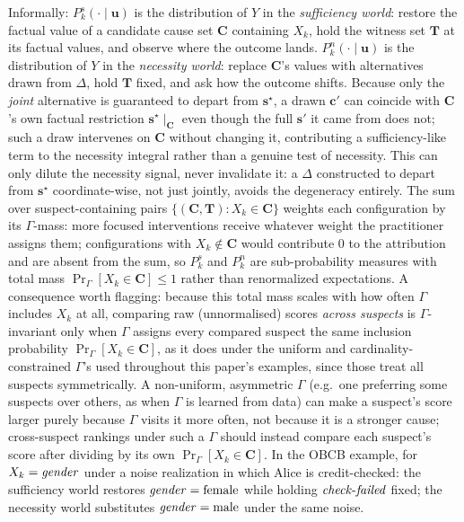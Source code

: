 \medskip\noindent
Informally: $P_k^s(\cdot\mid\mathbf{u})$ is the distribution of $Y$ in the
\emph{sufficiency world}: restore the factual value of a candidate cause set
$\mathbf{C}$ containing $X_k$, hold the witness set $\mathbf{T}$ at its factual values,
and observe where the outcome lands. $P_k^n(\cdot\mid\mathbf{u})$ is the distribution of
$Y$ in the \emph{necessity world}: replace $\mathbf{C}$'s values with alternatives
drawn from $\Delta$, hold $\mathbf{T}$ fixed, and ask how the outcome shifts.
Because only the \emph{joint} alternative is guaranteed to depart from
$\mathbf{s}^\star$, a drawn $\mathbf{c}'$ can coincide with $\mathbf{C}$'s own
factual restriction $\mathbf{s}^\star\!\mid_{\mathbf{C}}$ even though the full
$\mathbf{s}'$ it came from does not; such a draw intervenes on $\mathbf{C}$
without changing it, contributing a sufficiency-like term to the necessity
integral rather than a genuine test of necessity. This can only dilute the
necessity signal, never invalidate it: a $\Delta$ constructed to depart from
$\mathbf{s}^\star$ coordinate-wise, not just jointly, avoids the degeneracy
entirely.
The sum over suspect-containing pairs $\{(\mathbf{C},\mathbf{T}):X_k\in\mathbf{C}\}$
weights each configuration by its $\Gamma$-mass: more focused interventions
receive whatever weight the practitioner assigns them; configurations with
$X_k\notin\mathbf{C}$ would contribute $0$ to the attribution and are absent
from the sum, so $P_k^s$ and $P_k^n$ are sub-probability measures with total
mass $\Pr_\Gamma[X_k\in\mathbf{C}]\le 1$ rather than renormalized expectations. A
consequence worth flagging: because this total mass scales with how often $\Gamma$
includes $X_k$ at all, comparing raw (unnormalised) scores \emph{across suspects}
is $\Gamma$-invariant only when $\Gamma$ assigns every compared suspect the same
inclusion probability $\Pr_\Gamma[X_k\in\mathbf{C}]$, as it does under the uniform and cardinality-constrained $\Gamma$'s used throughout this paper's
examples, since those treat all suspects symmetrically. A non-uniform, asymmetric
$\Gamma$ (e.g.\ one preferring some suspects over others, as when $\Gamma$ is
learned from data) can make a suspect's score larger purely because $\Gamma$ visits
it more often, not because it is a stronger cause; cross-suspect rankings under such
a $\Gamma$ should instead compare each suspect's score after dividing by its own
$\Pr_\Gamma[X_k\in\mathbf{C}]$. In the OBCB example,
for $X_k=\varname{gender}$ under a noise realization in which Alice is credit-checked:
the sufficiency world restores $\varname{gender}=\text{female}$ while holding
$\varname{check\text{-}failed}$ fixed; the necessity world substitutes
$\varname{gender}=\text{male}$ under the same noise.

